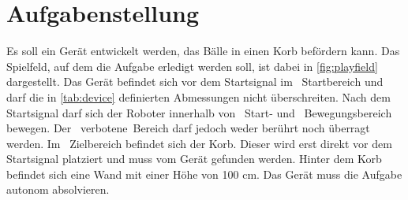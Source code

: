 \section{Aufgabenstellung}
\label{sec:aufgabe}
Es soll ein Gerät entwickelt werden, das Bälle in einen Korb befördern kann.  
Das Spielfeld, auf dem die Aufgabe erledigt werden soll, ist dabei in 
\autoref{fig:playfield} dargestellt. Das Gerät befindet sich vor dem 
Startsignal im \mbox{ 
Startbereich} und darf die in \autoref{tab:device} definierten Abmessungen 
nicht überschreiten. Nach dem Startsignal darf sich der Roboter innerhalb von 
\mbox{ Start}- und 
\mbox{ Bewegungsbereich} 
bewegen. Der \mbox{ 
verbotene Bereich} darf jedoch weder berührt noch überragt werden. Im 
\mbox{ Zielbereich} 
befindet sich der Korb. Dieser wird erst direkt vor dem Startsignal platziert 
und muss vom Gerät  gefunden werden. Hinter dem Korb befindet sich eine Wand 
mit einer Höhe von 100 cm. Das Gerät muss die Aufgabe autonom absolvieren. 
